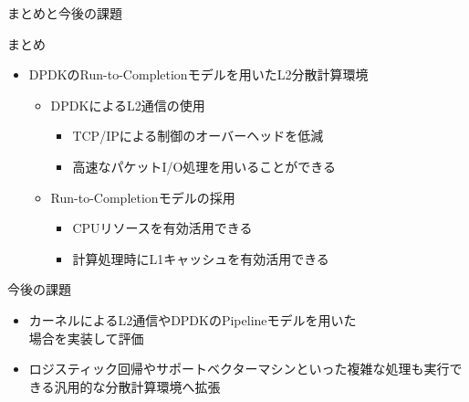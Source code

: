 \documentclass[12pt, unicode]{beamer}
\begin{document}
\begin{frame}{まとめと今後の課題}
  \begin{block}{まとめ}
    \begin{itemize}
      \item DPDKのRun-to-Completionモデルを用いたL2分散計算環境
      \begin{itemize}
        \item DPDKによるL2通信の使用
        \begin{itemize}
          \item TCP/IPによる制御のオーバーヘッドを低減
          \item 高速なパケットI/O処理を用いることができる
        \end{itemize}
        \item Run-to-Completionモデルの採用
        \begin{itemize}
          \item CPUリソースを有効活用できる
          \item 計算処理時にL1キャッシュを有効活用できる
        \end{itemize}
      \end{itemize}
    \end{itemize}
  \end{block}

  \begin{block}{今後の課題}
    \begin{itemize}
      \item カーネルによるL2通信やDPDKのPipelineモデルを用いた\\場合を実装して評価
      \item ロジスティック回帰やサポートベクターマシンといった複雑な処理も実行できる汎用的な分散計算環境へ拡張
    \end{itemize}
  \end{block}
\end{frame}
\end{document}
